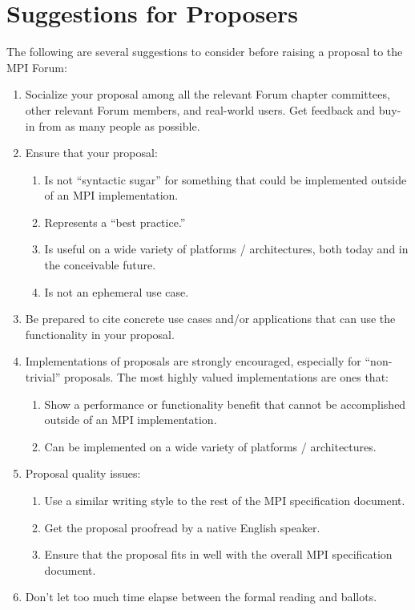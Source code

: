 \chapter{Suggestions for Proposers}

\vspace{-10pt}

The following are several suggestions to consider before raising a
proposal to the MPI Forum:

\begin{enumerate}
\item Socialize your proposal among all the relevant Forum chapter
  committees, other relevant Forum members, and real-world users.  Get
  feedback and buy-in from as many people as possible.

\item Ensure that your proposal:
  \begin{enumerate}
  \item Is not ``syntactic sugar'' for something that could be
    implemented outside of an MPI implementation.
  \item Represents a ``best practice.''
  \item Is useful on a wide variety of platforms / architectures, both
    today and in the conceivable future.
  \item Is not an ephemeral use case.
  \end{enumerate}

\item Be prepared to cite concrete use cases and/or applications that
  can use the functionality in your proposal.

\item Implementations of proposals are strongly encouraged, especially
  for ``non-trivial'' proposals.  The most highly valued
  implementations are ones that:
  \begin{enumerate}
  \item Show a performance or functionality benefit that cannot be
    accomplished outside of an MPI implementation.
  \item Can be implemented on a wide variety of platforms /
    architectures.
  \end{enumerate}

\item Proposal quality issues:
  \begin{enumerate}
  \item Use a similar writing style to the rest of the MPI
    specification document.
  \item Get the proposal proofread by a native English speaker.
  \item Ensure that the proposal fits in well with the overall MPI
    specification document.
  \end{enumerate}

\item Don't let too much time elapse between the formal reading and
  ballots.

\end{enumerate}
